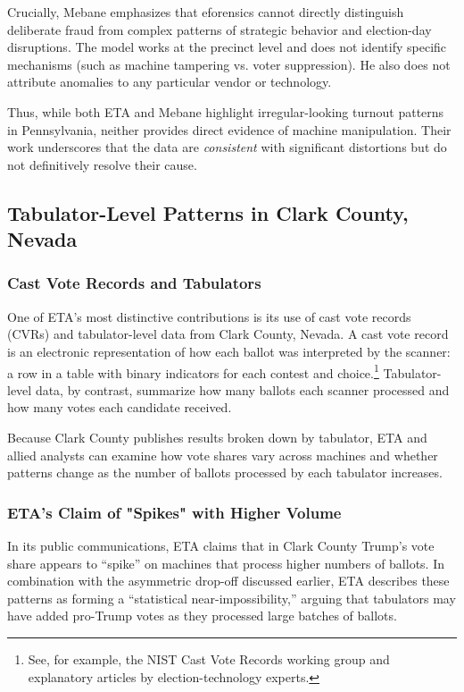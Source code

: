 \documentclass[12pt]{article}
\begin{document}
Crucially, Mebane emphasizes that eforensics cannot directly distinguish deliberate fraud from complex patterns of strategic behavior and election-day disruptions. The model works at the precinct level and does not identify specific mechanisms (such as machine tampering vs. voter suppression). He also does not attribute anomalies to any particular vendor or technology.

Thus, while both ETA and Mebane highlight irregular-looking turnout patterns in Pennsylvania, neither provides direct evidence of machine manipulation. Their work underscores that the data are \emph{consistent} with significant distortions but do not definitively resolve their cause.

\subsection{Tabulator-Level Patterns in Clark County, Nevada}

\subsubsection{Cast Vote Records and Tabulators}

One of ETA's most distinctive contributions is its use of cast vote records (CVRs) and tabulator-level data from Clark County, Nevada. A cast vote record is an electronic representation of how each ballot was interpreted by the scanner: a row in a table with binary indicators for each contest and choice.\footnote{See, for example, the NIST Cast Vote Records working group and explanatory articles by election-technology experts.} Tabulator-level data, by contrast, summarize how many ballots each scanner processed and how many votes each candidate received.

Because Clark County publishes results broken down by tabulator, ETA and allied analysts can examine how vote shares vary across machines and whether patterns change as the number of ballots processed by each tabulator increases.

\subsubsection{ETA's Claim of "Spikes" with Higher Volume}

In its public communications, ETA claims that in Clark County Trump's vote share appears to \enquote{spike} on machines that process higher numbers of ballots. In combination with the asymmetric drop-off discussed earlier, ETA describes these patterns as forming a \enquote{statistical near-impossibility,} arguing that tabulators may have added pro-Trump votes as they processed large batches of ballots.
\end{document}
